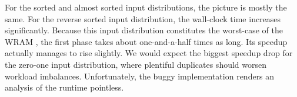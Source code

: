 For the sorted and almost sorted input distributions, the picture is mostly the same.
For the reverse sorted input distribution, the wall-clock time increases significantly.
Because this input distribution constitutes the worst-case of the \ac{WRAM} \MS{}, the first phase takes about one-and-a-half times as long.
Its speedup actually manages to rise slightly.
We would expect the biggest speedup drop for the zero-one input distribution, where plentiful duplicates should worsen workload imbalances.
Unfortunately, the buggy implementation renders an analysis of the runtime pointless.
